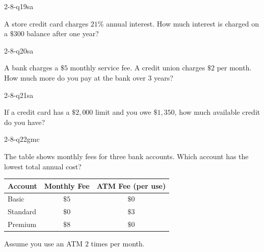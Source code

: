\begin{practiceQuestion}{2-8-q19}{sa}
\begin{questionText}
A store credit card charges $21\%$ annual interest. How much interest is charged on a $\$300$ balance after one year?
\end{questionText}
\end{practiceQuestion}

\begin{practiceQuestion}{2-8-q20}{sa}
\begin{questionText}
A bank charges a $\$5$ monthly service fee. A credit union charges $\$2$ per month. How much more do you pay at the bank over $3$ years?
\end{questionText}
\end{practiceQuestion}

\begin{practiceQuestion}{2-8-q21}{sa}
\begin{questionText}
If a credit card has a $\$2{,}000$ limit and you owe $\$1{,}350$, how much available credit do you have?
\end{questionText}
\end{practiceQuestion}


\begin{practiceQuestion}{2-8-q22}{gmc}
\begin{questionText}
The table shows monthly fees for three bank accounts. Which account has the lowest total annual cost?

\begin{center}
\begin{tabular}{|l|c|c|}
\hline
\textbf{Account} & \textbf{Monthly Fee} & \textbf{ATM Fee (per use)} \\
\hline
Basic & $\$5$ & $\$0$ \\
\hline
Standard & $\$0$ & $\$3$ \\
\hline
Premium & $\$8$ & $\$0$ \\
\hline
\end{tabular}
\end{center}

Assume you use an ATM $2$ times per month.
\end{questionText}
\end{practiceQuestion}

